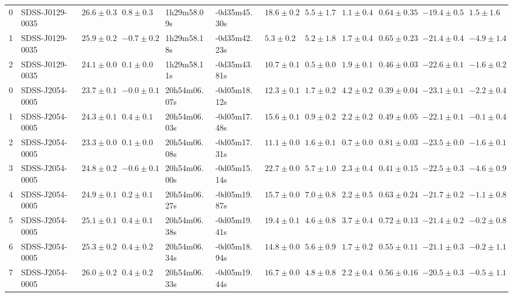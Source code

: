 \begin{tabular}{llllllllllll}
0 &   SDSS-J0129-0035 &  $26.6\pm0.3$ &   $0.8\pm0.3$ &   1h29m58.09s &  -0d35m45.30s &  $18.6\pm0.2$ &  $5.5\pm1.7$ &  $1.1\pm0.4$ &  $0.64\pm0.35$ &  $-19.4\pm0.5$ &   $1.5\pm1.6$ \\
1 &   SDSS-J0129-0035 &  $25.9\pm0.2$ &  $-0.7\pm0.2$ &   1h29m58.18s &  -0d35m42.23s &   $5.3\pm0.2$ &  $5.2\pm1.8$ &  $1.7\pm0.4$ &  $0.65\pm0.23$ &  $-21.4\pm0.4$ &  $-4.9\pm1.4$ \\
2 &   SDSS-J0129-0035 &  $24.1\pm0.0$ &   $0.1\pm0.0$ &   1h29m58.11s &  -0d35m43.81s &  $10.7\pm0.1$ &  $0.5\pm0.0$ &  $1.9\pm0.1$ &  $0.46\pm0.03$ &  $-22.6\pm0.1$ &  $-1.6\pm0.2$ \\
0 &   SDSS-J2054-0005 &  $23.7\pm0.1$ &  $-0.0\pm0.1$ &  20h54m06.07s &  -0d05m18.12s &  $12.3\pm0.1$ &  $1.7\pm0.2$ &  $4.2\pm0.2$ &  $0.39\pm0.04$ &  $-23.1\pm0.1$ &  $-2.2\pm0.4$ \\
1 &   SDSS-J2054-0005 &  $24.3\pm0.1$ &   $0.4\pm0.1$ &  20h54m06.03s &  -0d05m17.48s &  $15.6\pm0.1$ &  $0.9\pm0.2$ &  $2.2\pm0.2$ &  $0.49\pm0.05$ &  $-22.1\pm0.1$ &  $-0.1\pm0.4$ \\
2 &   SDSS-J2054-0005 &  $23.3\pm0.0$ &   $0.1\pm0.0$ &  20h54m06.08s &  -0d05m17.31s &  $11.1\pm0.0$ &  $1.6\pm0.1$ &  $0.7\pm0.0$ &  $0.81\pm0.03$ &  $-23.5\pm0.0$ &  $-1.6\pm0.1$ \\
3 &   SDSS-J2054-0005 &  $24.8\pm0.2$ &  $-0.6\pm0.1$ &  20h54m06.00s &  -0d05m15.14s &  $22.7\pm0.0$ &  $5.7\pm1.0$ &  $2.3\pm0.4$ &  $0.41\pm0.15$ &  $-22.5\pm0.3$ &  $-4.6\pm0.9$ \\
4 &   SDSS-J2054-0005 &  $24.9\pm0.1$ &   $0.2\pm0.1$ &  20h54m06.27s &  -0d05m19.87s &  $15.7\pm0.0$ &  $7.0\pm0.8$ &  $2.2\pm0.5$ &  $0.63\pm0.24$ &  $-21.7\pm0.2$ &  $-1.1\pm0.8$ \\
5 &   SDSS-J2054-0005 &  $25.1\pm0.1$ &   $0.4\pm0.1$ &  20h54m06.38s &  -0d05m19.41s &  $19.4\pm0.1$ &  $4.6\pm0.8$ &  $3.7\pm0.4$ &  $0.72\pm0.13$ &  $-21.4\pm0.2$ &  $-0.2\pm0.8$ \\
6 &   SDSS-J2054-0005 &  $25.3\pm0.2$ &   $0.4\pm0.2$ &  20h54m06.34s &  -0d05m18.94s &  $14.8\pm0.0$ &  $5.6\pm0.9$ &  $1.7\pm0.2$ &  $0.55\pm0.11$ &  $-21.1\pm0.3$ &  $-0.2\pm1.1$ \\
7 &   SDSS-J2054-0005 &  $26.0\pm0.2$ &   $0.4\pm0.2$ &  20h54m06.33s &  -0d05m19.44s &  $16.7\pm0.0$ &  $4.8\pm0.8$ &  $2.2\pm0.4$ &  $0.56\pm0.16$ &  $-20.5\pm0.3$ &  $-0.5\pm1.1$ \\
\bottomrule
\end{tabular}
